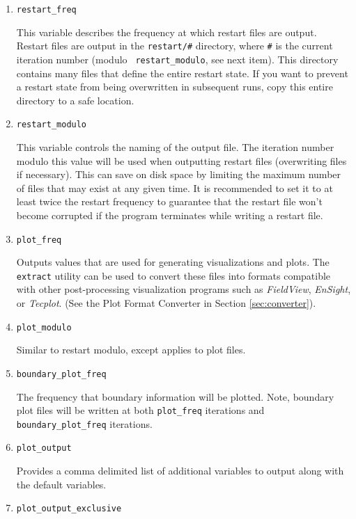 \documentclass{article}
\begin{document}
\begin{enumerate}
\item {\tt restart\_freq} 

  This variable describes the frequency at which restart files are output.
  Restart files are output in the {\tt restart/\#} directory, where
  {\tt \#} is the current iteration number (modulo {\tt
    restart\_modulo}, see next item).  This directory contains many
  files that define the entire restart state.  If you want to prevent a
  restart state from being overwritten in subsequent runs, copy this
  entire directory to a safe location.  

\item {\tt restart\_modulo} 

This variable controls the naming of the output file.  The iteration
number modulo this value will be used when outputting restart files
(overwriting files if necessary).  This can save on disk space by
limiting the maximum number of files that may exist at any given time.
It is recommended to set it to at least twice the restart frequency to
guarantee that the restart file won't become corrupted if the program
terminates while writing a restart file.


\item {\tt plot\_freq}

Outputs values that are used for generating visualizations and plots.
The {\tt extract} utility can be used to convert these files into
formats compatible with other post-processing visualization programs
such as {\em FieldView}, {\em EnSight}, or {\em Tecplot}. (See the Plot Format Converter in Section
\ref{sec:converter}).

\item {\tt plot\_modulo}

Similar to restart modulo, except applies to plot files.

\item {\tt boundary\_plot\_freq}

  The frequency that boundary information will be plotted.  Note,
  boundary plot files will be written at both {\tt plot\_freq}
  iterations and {\tt boundary\_plot\_freq} iterations.

\item {\tt plot\_output}

  Provides a comma delimited list of additional variables to output
  along with the default variables.  

\item {\tt plot\_output\_exclusive}


\end{enumerate}
\end{document}
